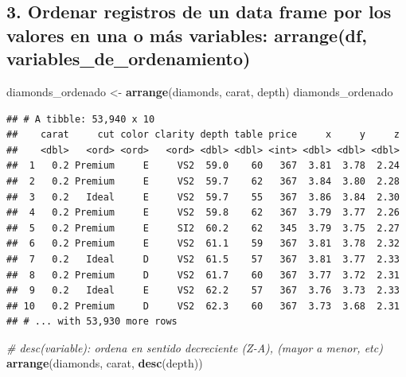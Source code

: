 \documentclass[]{book}
\newenvironment{Shaded}{\begin{snugshade}}{\end{snugshade}}
\newcommand{\KeywordTok}[1]{\textcolor[rgb]{0.13,0.29,0.53}{\textbf{#1}}}
\newcommand{\StringTok}[1]{\textcolor[rgb]{0.31,0.60,0.02}{#1}}
\newcommand{\CommentTok}[1]{\textcolor[rgb]{0.56,0.35,0.01}{\textit{#1}}}
\newcommand{\NormalTok}[1]{#1}
\theoremstyle{definition}
\theoremstyle{definition}
\theoremstyle{definition}
\theoremstyle{remark}
\begin{document}
\subsection{3. Ordenar registros de un data frame por los valores en una
o más variables: arrange(df,
variables\_de\_ordenamiento)}\label{ordenar-registros-de-un-data-frame-por-los-valores-en-una-o-mas-variables-arrangedf-variables_de_ordenamiento}

\begin{Shaded}
\begin{Highlighting}[]
\NormalTok{diamonds_ordenado <-}\StringTok{ }\KeywordTok{arrange}\NormalTok{(diamonds, carat, depth)}
\NormalTok{diamonds_ordenado}
\end{Highlighting}
\end{Shaded}

\begin{verbatim}
## # A tibble: 53,940 x 10
##    carat     cut color clarity depth table price     x     y     z
##    <dbl>   <ord> <ord>   <ord> <dbl> <dbl> <int> <dbl> <dbl> <dbl>
##  1   0.2 Premium     E     VS2  59.0    60   367  3.81  3.78  2.24
##  2   0.2 Premium     E     VS2  59.7    62   367  3.84  3.80  2.28
##  3   0.2   Ideal     E     VS2  59.7    55   367  3.86  3.84  2.30
##  4   0.2 Premium     E     VS2  59.8    62   367  3.79  3.77  2.26
##  5   0.2 Premium     E     SI2  60.2    62   345  3.79  3.75  2.27
##  6   0.2 Premium     E     VS2  61.1    59   367  3.81  3.78  2.32
##  7   0.2   Ideal     D     VS2  61.5    57   367  3.81  3.77  2.33
##  8   0.2 Premium     D     VS2  61.7    60   367  3.77  3.72  2.31
##  9   0.2   Ideal     E     VS2  62.2    57   367  3.76  3.73  2.33
## 10   0.2 Premium     D     VS2  62.3    60   367  3.73  3.68  2.31
## # ... with 53,930 more rows
\end{verbatim}

\begin{Shaded}
\begin{Highlighting}[]
\CommentTok{# desc(variable): ordena en sentido decreciente (Z-A), (mayor a menor, etc)}
\KeywordTok{arrange}\NormalTok{(diamonds, carat, }\KeywordTok{desc}\NormalTok{(depth))}
\end{Highlighting}
\end{Shaded}
\end{document}
